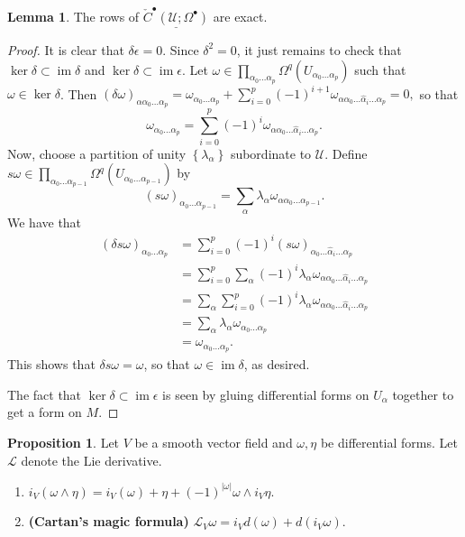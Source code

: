 \documentclass[10pt,letterpaper,cm]{nupset}
\theoremstyle{definition}
\theoremstyle{theorem}
\newtheorem{lemma}[definition]{Lemma}
\newtheorem{prop}[definition]{Proposition}
\theoremstyle{remark}
\newcommand{\U}{\mathcal U}
\newcommand{\1}{\mathbb{1}}
\newcommand{\0}{\vec 0}
\DeclareMathOperator{\im}{im}
\begin{document}
\begin{lemma}
The rows of $\underline{\check{C}^{\bullet}(\U; \Omega^{\bullet})}$ are exact.
\end{lemma}
\begin{proof}
It is clear that  $\delta{\epsilon}=0$. Since $\delta^2 = 0$, it just remains to check that $\ker{\delta} \subset \im{\delta}$ and $\ker{\delta} \subset \im{\epsilon}$.  Let $\omega \in \prod_{\alpha_0 \ldots \alpha_p} \Omega^q(U_{\alpha_0 \ldots \alpha_p})$ such that $\omega \in \ker{\delta}$. Then $\left(\delta{\omega}\right)_{\alpha \alpha_0 \ldots \alpha_p} =\omega_{\alpha_0 \ldots \alpha_p} + \sum_{i=0}^p ({-1})^{i+1} \omega_{\alpha \alpha_0\ldots \hat{\alpha}_i\ldots \alpha_p} = 0, $ so that $$\omega_{\alpha_0 \ldots \alpha_p}  =  \sum_{i=0}^p ({-1})^{i} \omega_{\alpha \alpha_0\ldots \hat{\alpha}_i\ldots \alpha_p}   .$$ 
Now, choose a partition of unity $\left\{\lambda_{\alpha}\right\}$ subordinate to $\U$. Define $s{\omega} \in \prod_{\alpha_0 \ldots \alpha_{p-1}} \Omega^q(U_{\alpha_0 \ldots \alpha_{p-1}})$ by $$\left(s{\omega}\right)_{\alpha_0 \ldots \alpha_{p-1}} = \sum_{\alpha} \lambda_{\alpha} \omega_{\alpha \alpha_0 \ldots \alpha_{p-1}}   .$$ We have that
\begin{align*}
\left(\delta{s\omega}\right)_{\alpha_0 \ldots \alpha_p}  & = \sum_{i=0}^p ({-1})^i \left(s\omega\right)_{\alpha_0 \ldots \hat{\alpha}_i \ldots \alpha_p}
\\ &  = \sum_{i=0}^p \sum_{\alpha} ({-1})^i \lambda_{\alpha} \omega_{\alpha \alpha_0 \ldots \hat{\alpha}_i \ldots \alpha_p}
\\ & = \sum_{\alpha} \sum_{i=0}^p ({-1})^i \lambda_{\alpha} \omega_{\alpha \alpha_0 \ldots \hat{\alpha}_i \ldots \alpha_p}
\\ & =  \sum_{\alpha} \lambda_{\alpha}\omega_{\alpha_0 \ldots \alpha_p} 
\\ & = \omega_{\alpha_0 \ldots \alpha_p}
. \end{align*}
This shows that $\delta{s{\omega}} =\omega$, so that $\omega \in \im{\delta}$, as desired. 
\medskip


 The fact that $\ker{\delta} \subset \im{\epsilon}$ is seen by gluing differential forms on $U_{\alpha}$ together to get a form on $M$.
\end{proof}

\begin{prop}\label{p4} Let $V$ be a smooth vector field and $\omega, \eta$ be differential forms. Let $\mathcal{L}$ denote the Lie derivative.
\begin{enumerate} 
\item  $i_V(\omega \wedge \eta) = i_V (\omega) + \eta  +({-1})^{\left\lvert{\omega}\right\rvert}\omega \wedge i_V{\eta}.$
\item {\textbf{(Cartan's magic formula)}}
$\mathcal{L}_V{\omega} = i_V{d(\omega)} + d(i_V{\omega}).$
\end{enumerate}
\end{prop}
\end{document}
